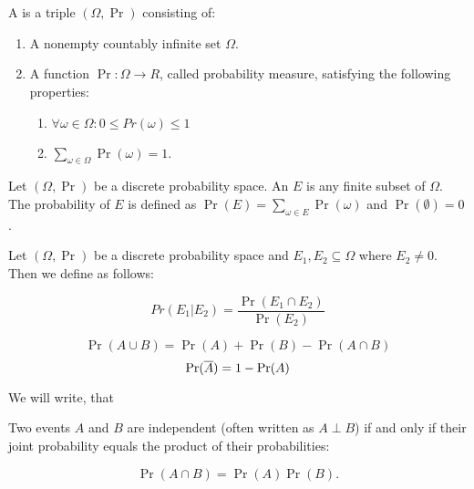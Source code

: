 \section{}
\begin{defn}
	A  is a triple
	$ (\Omega,\Pr) $ consisting of:
	
	\begin{enumerate}
	\item A nonempty countably infinite set $ \Omega $.
	\item A function $ \Pr: \Omega \rightarrow R $, called probability measure, 
	satisfying the following properties:
		\begin{enumerate}
			\item $  \forall \omega \in \Omega: 0 \leq Pr(\omega) \leq 1 $ %
			\item $ \sum_{\omega \in \Omega}\Pr({\omega}) = 1 $.
		\end{enumerate}
	\end{enumerate}
\end{defn}

\begin{defn}
	Let $ (\Omega,\Pr) $ be a discrete probability space. An  $ E $ is any finite subset of $ \Omega $. The probability of $ E $ is defined as 
	$ \Pr(E) = \sum_{\omega \in E}\Pr(\omega)  $ and $ \Pr(\emptyset) = 0$.
\end{defn}

\begin{defn}
	Let $ (\Omega, \Pr) $ be a discrete probability space and $ E_{1}, E_{2} \subseteq \Omega $  where $ E_{2} \neq 0 $. Then we define  as follows:
	
	 \[ Pr(E_{1} | E_{2}) = \dfrac{\Pr(E_{1} \cap E_{2})}{\Pr(E_{2})} \]
\end{defn}

\begin{lemma}
	\[ \Pr(A \cup B) = \Pr(A) + \Pr(B) - \Pr(A \cap B) \]
	\[\Pr(\overline{A}) = 1-\Pr(A)\]
\end{lemma}


\begin{defn}
	We will write, that 
\end{defn}

\begin{thm}
\end{thm}

\begin{defn}
Two events $ A $ and $ B $ are independent (often written as $ A \perp B  $) if and only if their joint probability equals the product of their probabilities:

\[ \Pr{(A \cap B)} = \Pr{(A)}\Pr{(B)}. \]
\end{defn} 
	
	
